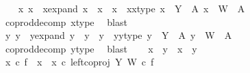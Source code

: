\begin{isabellebody}
\isanewline
\ \ \isamarkupfalse%
\ x{}\ x{}\ \ x{\isacharunderscore}{\kern0pt}expand{\isacharcolon}{\kern0pt}\ {\isachardoublequoteopen}x\ {\isacharequal}{\kern0pt}\ x{}\ {\isasymamalg}\ x{}{\isachardoublequoteclose}\ \ x{}{\isacharunderscore}{\kern0pt}x{}{\isacharunderscore}{\kern0pt}type{\isacharcolon}{\kern0pt}\ {\isachardoublequoteopen}x{}\ {\isacharcolon}{\kern0pt}\ Y\ {\isasymrightarrow}\ A{\isachardoublequoteclose}\ {\isachardoublequoteopen}x{}\ {\isacharcolon}{\kern0pt}\ W\ {\isasymrightarrow}\ A{\isachardoublequoteclose}\isanewline
\ \ \ \ \isamarkupfalse%
\ coprod{\isacharunderscore}{\kern0pt}decomp\ x{\isacharunderscore}{\kern0pt}type\ \isamarkupfalse%
\ blast\isanewline
\ \ \isamarkupfalse%
\ y{}\ y{}\ \ y{\isacharunderscore}{\kern0pt}expand{\isacharcolon}{\kern0pt}\ {\isachardoublequoteopen}y\ {\isacharequal}{\kern0pt}\ y{}\ {\isasymamalg}\ y{}{\isachardoublequoteclose}\ \ y{}{\isacharunderscore}{\kern0pt}y{}{\isacharunderscore}{\kern0pt}type{\isacharcolon}{\kern0pt}\ {\isachardoublequoteopen}y{}\ {\isacharcolon}{\kern0pt}\ Y\ {\isasymrightarrow}\ A{\isachardoublequoteclose}\ {\isachardoublequoteopen}y{}\ {\isacharcolon}{\kern0pt}\ W\ {\isasymrightarrow}\ A{\isachardoublequoteclose}\isanewline
\ \ \ \ \isamarkupfalse%
\ coprod{\isacharunderscore}{\kern0pt}decomp\ y{\isacharunderscore}{\kern0pt}type\ \isamarkupfalse%
\ blast\isanewline
\isanewline
\ \ \isamarkupfalse%
\ {\isachardoublequoteopen}{\isacharparenleft}{\kern0pt}x{}\ {\isacharequal}{\kern0pt}\ y{}{\isacharparenright}{\kern0pt}\ {\isasymand}\ {\isacharparenleft}{\kern0pt}x{}\ {\isacharequal}{\kern0pt}\ y{}{\isacharparenright}{\kern0pt}{\isachardoublequoteclose}\isanewline
\ \ \isamarkupfalse%
\isanewline
\ \ \ \ \isamarkupfalse%
\ {\isachardoublequoteopen}x{}\ {\isasymcirc}\isactrlsub c\ f\ {\isacharequal}{\kern0pt}\ {\isacharparenleft}{\kern0pt}{\isacharparenleft}{\kern0pt}x{}\ {\isasymamalg}\ x{}{\isacharparenright}{\kern0pt}\ {\isasymcirc}\isactrlsub c\ left{\isacharunderscore}{\kern0pt}coproj\ Y\ W{\isacharparenright}{\kern0pt}\ {\isasymcirc}\isactrlsub c\ f{\isachardoublequoteclose}\isanewline

\end{isabellebody}
